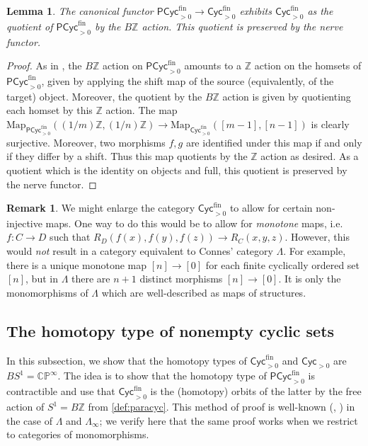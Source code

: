\documentclass{amsart}
\theoremstyle{plain}
\newtheorem{lem}[thm]{Lemma}
\theoremstyle{definition}
\newtheorem{rmk}[thm]{Remark}
\newcommand{\ints}{\mathbb{Z}}
\newcommand{\cpx}{\mathbb{C}}
\newcommand{\Map}{\mathrm{Map}}
\newcommand{\Cyc}{\mathsf{Cyc}}
\newcommand{\fin}{\mathrm{fin}}
\newcommand{\catdeloop}{B}
\newcommand{\Paracyc}{\mathsf{PCyc}}
\newcommand{\pjv}{\mathbb{P}}
\begin{document}
\begin{lem}\label{lem:horb}
The canonical functor $\Paracyc^\fin_{>0} \to \Cyc^\fin_{>0}$ exhibits $\Cyc^\fin_{>0}$ as the quotient of $\Paracyc^\fin_{>0}$ by the $\catdeloop \ints$ action. This quotient is preserved by the nerve functor. 
\end{lem}
\begin{proof}
As in \cite[Appendix B]{nikolaus-scholze}, the $\catdeloop \ints$ action on $\Paracyc^\fin_{>0}$ amounts to a $\ints$ action on the homsets of $\Paracyc^\fin_{>0}$, given by applying the shift map of the source (equivalently, of the target) object. Moreover, the quotient by the $\catdeloop \ints$ action is given by quotienting each homset by this $\ints$ action. The map $\Map_{\Paracyc^\fin_{>0}}((1/m)\ints, (1/n)\ints) \to \Map_{\Cyc^\fin_{>0}}([m-1], [n-1])$ is clearly surjective. Moreover, two morphisms $f,g$ are identified under this map if and only if they differ by a shift. Thus this map quotients by the $\ints$ action as desired. As a quotient which is the identity on objects and full, this quotient is preserved by the nerve functor.
\end{proof}

\begin{rmk}
We might enlarge the category $\Cyc_{>0}^\fin$ to allow for certain non-injective maps. One way to do this would be to allow for \emph{monotone} maps, i.e. $f:C\to D$ such that $R_D(f(x), f(y), f(z))\rightarrow R_C(x,y,z)$. However, this would \emph{not} result in a category equivalent to Connes' category $\Lambda$. For example, there is a unique monotone map $[n] \to [0]$ for each finite cyclically ordered set $[n]$, but in $\Lambda$ there are $n+1$ distinct morphisms $[n] \to [0]$. It is only the monomorphisms of $\Lambda$ which are well-described as maps of structures.
\end{rmk}

\subsection{The homotopy type of nonempty cyclic sets}

In this subsection, we show that the homotopy types of $\Cyc_{>0}^\fin$ and $\Cyc_{>0}$ are $BS^1 = \cpx \pjv^\infty$. The idea is to show that the homotopy type of $\Paracyc_{>0}^\fin$ is contractible and use that $\Cyc_{>0}^\fin$ is the (homotopy) orbits of the latter by the free action of $S^1 = B \ints$ from \cref{def:paracyc}. This method of proof is well-known (\cite{cisinski}, \cite{nikolaus-scholze}) in the case of $\Lambda$ and $\Lambda_\infty$; we verify here that the same proof works when we restrict to categories of monomorphisms.
\end{document}
